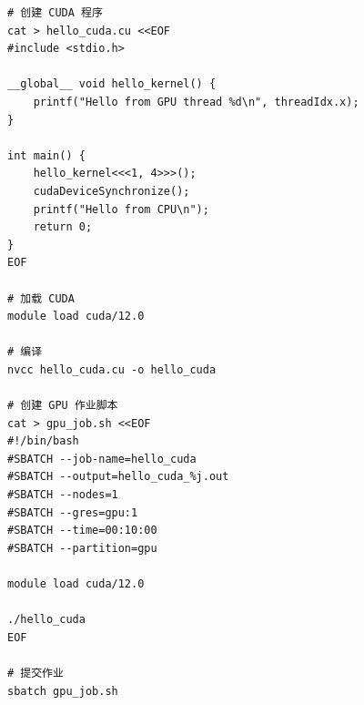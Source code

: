 \documentclass[12pt,UTF8]{ctexbook}
\begin{document}
\begin{verbatim}
# 创建 CUDA 程序
cat > hello_cuda.cu <<EOF
#include <stdio.h>

__global__ void hello_kernel() {
    printf("Hello from GPU thread %d\n", threadIdx.x);
}

int main() {
    hello_kernel<<<1, 4>>>();
    cudaDeviceSynchronize();
    printf("Hello from CPU\n");
    return 0;
}
EOF

# 加载 CUDA
module load cuda/12.0

# 编译
nvcc hello_cuda.cu -o hello_cuda

# 创建 GPU 作业脚本
cat > gpu_job.sh <<EOF
#!/bin/bash
#SBATCH --job-name=hello_cuda
#SBATCH --output=hello_cuda_%j.out
#SBATCH --nodes=1
#SBATCH --gres=gpu:1
#SBATCH --time=00:10:00
#SBATCH --partition=gpu

module load cuda/12.0

./hello_cuda
EOF

# 提交作业
sbatch gpu_job.sh
\end{verbatim}

\backmatter
\end{document}
